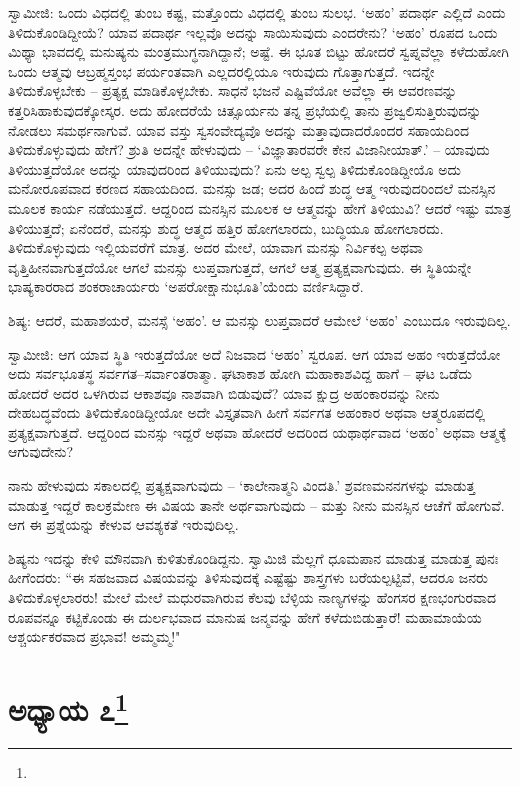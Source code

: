 ಸ್ವಾಮೀಜಿ: ಒಂದು ವಿಧದಲ್ಲಿ ತುಂಬ ಕಷ್ಟ, ಮತ್ತೊಂದು ವಿಧದಲ್ಲಿ ತುಂಬ ಸುಲಭ. ‘ಅಹಂ’ ಪದಾರ್ಥ ಎಲ್ಲಿದೆ ಎಂದು ತಿಳಿದುಕೊಂಡಿದ್ದೀಯೆ? ಯಾವ ಪದಾರ್ಥ ಇಲ್ಲವೊ ಅದನ್ನು ಸಾಯಿಸುವುದು ಎಂದರೇನು? ‘ಅಹಂ’ ರೂಪದ ಒಂದು ಮಿಥ್ಯಾ ಭಾವದಲ್ಲಿ ಮನುಷ್ಯನು ಮಂತ್ರಮುಗ್ಧನಾಗಿದ್ದಾನೆ; ಅಷ್ಟೆ. ಈ ಭೂತ ಬಿಟ್ಟು ಹೋದರೆ ಸ್ವಪ್ನವೆಲ್ಲಾ ಕಳೆದುಹೋಗಿ ಒಂದು ಆತ್ಮವು ಆಬ್ರಹ್ಮಸ್ತಂಭ ಪರ್ಯಂತವಾಗಿ ಎಲ್ಲದರಲ್ಲಿಯೂ ಇರುವುದು ಗೊತ್ತಾಗುತ್ತದೆ. ಇದನ್ನೇ ತಿಳಿದುಕೊಳ್ಳಬೇಕು – ಪ್ರತ್ಯಕ್ಷ ಮಾಡಿಕೊಳ್ಳಬೇಕು. ಸಾಧನೆ ಭಜನೆ ಎಷ್ಟಿವೆಯೋ ಅವೆಲ್ಲಾ ಈ ಆವರಣವನ್ನು ಕತ್ತರಿಸಿಹಾಕುವುದಕ್ಕೋಸ್ಕರ. ಅದು ಹೋದರೆಯೆ ಚಿತ್ಸೂರ್ಯನು ತನ್ನ ಪ್ರಭೆಯಲ್ಲಿ ತಾನು ಪ್ರಜ್ವಲಿಸುತ್ತಿರುವುದನ್ನು ನೋಡಲು ಸಮರ್ಥನಾಗುವೆ. ಯಾವ ವಸ್ತು ಸ್ವಸಂವೇದ್ಯವೊ ಅದನ್ನು ಮತ್ತಾವುದಾದರೊಂದರ ಸಹಾಯದಿಂದ ತಿಳಿದುಕೊಳ್ಳುವುದು ಹೇಗೆ? ಶ್ರುತಿ ಅದನ್ನೇ ಹೇಳುವುದು – ‘ವಿಜ್ಞಾತಾರವರೇ ಕೇನ ವಿಜಾನೀಯಾತ್.’ – ಯಾವುದು ತಿಳಿಯುತ್ತದೆಯೋ ಅದನ್ನು ಯಾವುದರಿಂದ ತಿಳಿಯುವುದು? ಏನು ಅಲ್ಪ ಸ್ವಲ್ಪ ತಿಳಿದುಕೊಂಡಿದ್ದೀಯೊ ಅದು ಮನೋರೂಪವಾದ ಕರಣದ ಸಹಾಯದಿಂದ. ಮನಸ್ಸು ಜಡ; ಅದರ ಹಿಂದೆ ಶುದ್ಧ ಆತ್ಮ ಇರುವುದರಿಂದಲೆ ಮನಸ್ಸಿನ ಮೂಲಕ ಕಾರ್ಯ ನಡೆಯುತ್ತದೆ. ಆದ್ದರಿಂದ ಮನಸ್ಸಿನ ಮೂಲಕ ಆ ಆತ್ಮವನ್ನು ಹೇಗೆ ತಿಳಿಯುವಿ? ಆದರೆ ಇಷ್ಟು ಮಾತ್ರ ತಿಳಿಯುತ್ತದೆ; ಏನೆಂದರೆ, ಮನಸ್ಸು ಶುದ್ಧ ಆತ್ಮದ ಹತ್ತಿರ ಹೋಗಲಾರದು, ಬುದ್ಧಿಯೂ ಹೋಗಲಾರದು. ತಿಳಿದುಕೊಳ್ಳುವುದು ಇಲ್ಲಿಯವರೆಗೆ ಮಾತ್ರ. ಅದರ ಮೇಲೆ, ಯಾವಾಗ ಮನಸ್ಸು ನಿರ್ವಿಕಲ್ಪ ಅಥವಾ ವೃತ್ತಿಹೀನವಾಗುತ್ತದೆಯೋ ಆಗಲೆ ಮನಸ್ಸು ಲುಪ್ತವಾಗುತ್ತದೆ, ಆಗಲೆ ಆತ್ಮ ಪ್ರತ್ಯಕ್ಷವಾಗುವುದು. ಈ ಸ್ಥಿತಿಯನ್ನೇ ಭಾಷ್ಯಕಾರರಾದ ಶಂಕರಾಚಾರ್ಯರು ‘ಅಪರೋಕ್ಷಾನುಭೂತಿ’ಯೆಂದು ವರ್ಣಿಸಿದ್ದಾರೆ.

ಶಿಷ್ಯ: ಆದರೆ, ಮಹಾಶಯರೆ, ಮನಸ್ಸೆ ‘ಅಹಂ’. ಆ ಮನಸ್ಸು ಲುಪ್ತವಾದರೆ ಆಮೇಲೆ ‘ಅಹಂ’ ಎಂಬುದೂ ಇರುವುದಿಲ್ಲ.

ಸ್ವಾಮೀಜಿ: ಆಗ ಯಾವ ಸ್ಥಿತಿ ಇರುತ್ತದೆಯೋ ಅದೆ ನಿಜವಾದ ‘ಅಹಂ’ ಸ್ವರೂಪ. ಆಗ ಯಾವ ಅಹಂ ಇರುತ್ತದೆಯೋ ಅದು ಸರ್ವಭೂತಸ್ಥ ಸರ್ವಗತ–ಸರ್ವಾಂತರಾತ್ಮಾ. ಘಟಾಕಾಶ ಹೋಗಿ ಮಹಾಕಾಶವಿದ್ದ ಹಾಗೆ – ಘಟ ಒಡೆದು ಹೋದರೆ ಅದರ ಒಳಗಿರುವ ಆಕಾಶವೂ ನಾಶವಾಗಿ ಬಿಡುವುದೆ? ಯಾವ ಕ್ಷುದ್ರ ಅಹಂಕಾರವನ್ನು ನೀನು ದೇಹಬದ್ಧವೆಂದು ತಿಳಿದುಕೊಂಡಿದ್ದೀಯೋ ಅದೇ ವಿಸ್ತೃತವಾಗಿ ಹೀಗೆ ಸರ್ವಗತ ಅಹಂಕಾರ ಅಥವಾ ಆತ್ಮರೂಪದಲ್ಲಿ ಪ್ರತ್ಯಕ್ಷವಾಗುತ್ತದೆ. ಆದ್ದರಿಂದ ಮನಸ್ಸು ಇದ್ದರೆ ಅಥವಾ ಹೋದರೆ ಅದರಿಂದ ಯಥಾರ್ಥವಾದ ‘ಅಹಂ’ ಅಥವಾ ಆತ್ಮಕ್ಕೆ ಆಗುವುದೇನು?

ನಾನು ಹೇಳುವುದು ಸಕಾಲದಲ್ಲಿ ಪ್ರತ್ಯಕ್ಷವಾಗುವುದು – ‘ಕಾಲೇನಾತ್ಮನಿ ವಿಂದತಿ.’ ಶ್ರವಣಮನನಗಳನ್ನು ಮಾಡುತ್ತ ಮಾಡುತ್ತ ಇದ್ದರೆ ಕಾಲಕ್ರಮೇಣ ಈ ವಿಷಯ ತಾನೇ ಅರ್ಥವಾಗುವುದು – ಮತ್ತು ನೀನು ಮನಸ್ಸಿನ ಆಚೆಗೆ ಹೋಗುವೆ. ಆಗ ಈ ಪ್ರಶ್ನೆಯನ್ನು ಕೇಳುವ ಆವಶ್ಯಕತೆ ಇರುವುದಿಲ್ಲ.

ಶಿಷ್ಯನು ಇದನ್ನು ಕೇಳಿ ಮೌನವಾಗಿ ಕುಳಿತುಕೊಂಡಿದ್ದನು. ಸ್ವಾಮಿಜಿ ಮೆಲ್ಲಗೆ ಧೂಮಪಾನ ಮಾಡುತ್ತ ಮಾಡುತ್ತ ಪುನಃ ಹೀಗೆಂದರು: “ಈ ಸಹಜವಾದ ವಿಷಯವನ್ನು ತಿಳಿಸುವುದಕ್ಕೆ ಎಷ್ಟೆಷ್ಟು ಶಾಸ್ತ್ರಗಳು ಬರೆಯಲ್ಪಟ್ಟಿವೆ, ಆದರೂ ಜನರು ತಿಳಿದುಕೊಳ್ಳಲಾರರು! ಮೇಲೆ ಮೇಲೆ ಮಧುರವಾಗಿರುವ ಕೆಲವು ಬೆಳ್ಳಿಯ ನಾಣ್ಯಗಳನ್ನು ಹೆಂಗಸರ ಕ್ಷಣಭಂಗುರವಾದ ರೂಪವನ್ನೂ ಕಟ್ಟಿಕೊಂಡು ಈ ದುರ್ಲಭವಾದ ಮಾನುಷ ಜನ್ಮವನ್ನು ಹೇಗೆ ಕಳೆದುಬಿಡುತ್ತಾರೆ! ಮಹಾಮಾಯೆಯ ಆಶ್ಚರ್ಯಕರವಾದ ಪ್ರಭಾವ! ಅಮ್ಮಮ್ಮ!"

\newpage

\chapter[ಅಧ್ಯಾಯ ೭]{ಅಧ್ಯಾಯ ೭\protect\footnote{}}

